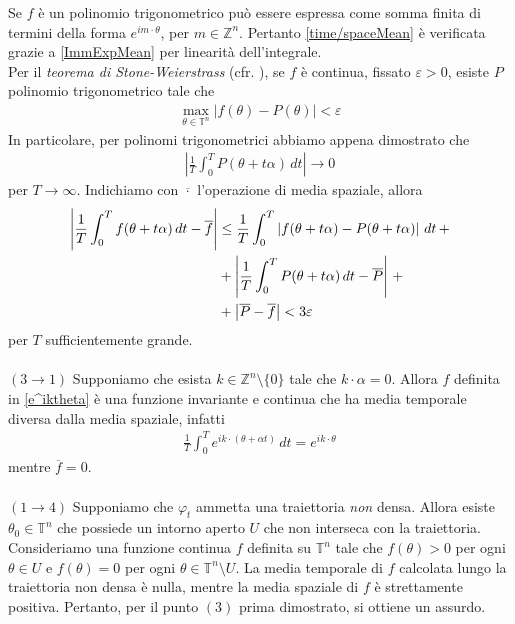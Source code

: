 \documentclass[twoside, 11pt]{amsbook}
\makeatletter
\newcommand{\0}{{(0)}}
\newcommand{\3}{{(3)}}
\theoremstyle{colonplain}
\theoremstyle{colondefinition}
\theoremstyle{colonremark}
\numberwithin{equation}{chapter}
\renewcommand{\proofname}{Dimostrazione}
\renewenvironment{proof}[1][\proofname]{\par
  \pushQED{\qed}%
  \normalfont \topsep6\p@\@plus6\p@\relax
  \trivlist
  \item[\hskip\labelsep\bfseries #1:]\ignorespaces
}{%
  \popQED\endtrivlist\@endpefalse
}
\makeatother
\begin{document}
\begin{proof}
Se $f$ è un polinomio trigonometrico può essere espressa come somma finita di termini della forma $e^{i m \cdot \theta}$, per $m \in \mathbb{Z}^n$. Pertanto \eqref{time/spaceMean} è verificata grazie a \eqref{ImmExpMean} per linearità dell'integrale. \\
Per il \textit{teorema di Stone-Weierstrass} (cfr. \cite{Pedersen}), se $f$ è continua, fissato $\varepsilon > 0$, esiste $P$ polinomio trigonometrico tale che
\begin{align}
    \max_{\theta \in \mathbb{T}^n} |f(\theta) - P(\theta)| < \varepsilon
\end{align}
In particolare, per polinomi trigonometrici abbiamo appena dimostrato che 
\begin{align}
    \left|\frac{1}{T}\int_0^T P(\theta + t\alpha) \, dt\right| \rightarrow 0
\end{align}
per $T \rightarrow \infty$. Indichiamo con $\overline{\cdot}$ l'operazione di media spaziale, allora
\begin{align}
    \left|\frac{1}{T}\int_0^T f(\theta + t\alpha) \, dt - \overline{f}\right| &\leq \frac{1}{T}\int_0^T \left|f(\theta + t\alpha) - P(\theta + t\alpha)\right| \, dt \, + \notag \\
    &+ \left|\frac{1}{T}\int_0^T P(\theta + t\alpha) \, dt - \overline{P}\right| \, + \notag \\
    &+ \left|\overline{P} - \overline{f}\right| < 3\varepsilon
\end{align}
per $T$ sufficientemente grande. \\ \\
$(3 \rightarrow 1)$ Supponiamo che esista $k \in \mathbb{Z}^n \setminus \{0\}$ tale che $k \cdot \alpha = 0$. Allora $f$ definita in \eqref{e^iktheta} è una funzione invariante e continua che ha media temporale diversa dalla media spaziale, infatti
\begin{align}
    \frac{1}{T}\int_0^T e^{i k \cdot (\theta + \alpha t)} \, dt = e^{i k \cdot \theta}
\end{align}
mentre $\overline{f} = 0$. \\ \\
$(1 \rightarrow 4)$ Supponiamo che $\varphi_t$ ammetta una traiettoria \textit{non} densa. Allora esiste $\theta_0 \in \mathbb{T}^n$ che possiede un intorno aperto $U$ che non interseca con la traiettoria. \\
Consideriamo una funzione continua $f$ definita su $\mathbb{T}^n$ tale che $f(\theta) > 0$ per ogni $\theta \in U$ e $f(\theta) = 0$ per ogni $\theta \in \mathbb{T}^n \setminus U$. La media temporale di $f$ calcolata lungo la traiettoria non densa è nulla, mentre la media spaziale di $f$ è strettamente positiva. Pertanto, per il punto $(3)$ prima dimostrato, si ottiene un assurdo. \\ \\

\end{proof}
\end{document}
